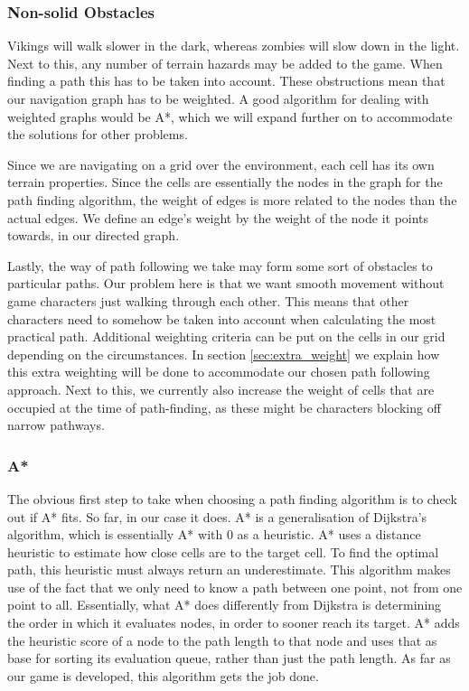 \subsubsection{Non-solid Obstacles}
Vikings will walk slower in the dark, whereas zombies will slow down in the light. Next to this, any number of terrain hazards may be added to the game. When finding a path this has to be taken into account. These obstructions mean that our navigation graph has to be weighted. A good algorithm for dealing with weighted graphs would be A*, which we will expand further on to accommodate the solutions for other problems.

Since we are navigating on a grid over the environment, each cell has its own terrain properties. Since the cells are essentially the nodes in the graph for the path finding algorithm, the weight of edges is more related to the nodes than the actual edges. We define an edge's weight by the weight of the node it points towards, in our directed graph. 

Lastly, the way of path following we take may form some sort of obstacles to particular paths. Our problem here is that we want smooth movement without game characters just walking through each other. This means that other characters need to somehow be taken into account when calculating the most practical path. Additional weighting criteria can be put on the cells in our grid depending on the circumstances. In section \ref{sec:extra_weight} we explain how this extra weighting will be done to accommodate our chosen path following approach. Next to this, we currently also increase the weight of cells that are occupied at the time of path-finding, as these might be characters blocking off narrow pathways.

\subsubsection{A*}
The obvious first step to take when choosing a path finding algorithm is to check out if A* fits. So far, in our case it does. A* is a generalisation of Dijkstra's algorithm, which is essentially A* with $0$ as a heuristic. A* uses a distance heuristic to estimate how close cells are to the target cell. To find the optimal path, this heuristic must always return an underestimate. This algorithm makes use of the fact that we only need to know a path between one point, not from one point to all. Essentially, what A* does differently from Dijkstra is determining the order in which it evaluates nodes, in order to sooner reach its target. A* adds the heuristic score of a node to the path length to that node and uses that as base for sorting its evaluation queue, rather than just the path length. As far as our game is developed, this algorithm gets the job done.

